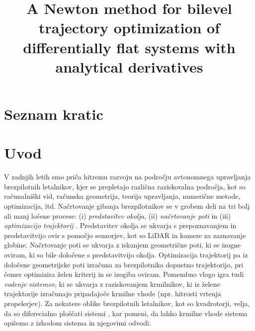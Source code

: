 \documentclass[mat2, tisk]{fmfdelo}
\title{A Newton method for bilevel trajectory optimization of differentially flat systems with analytical derivatives}
\begin{document}
\section*{Seznam kratic}
\printacronyms[heading=none]

\section{Uvod}

V zadnjih letih smo priča hitremu razvoju na področju avtonomnega upravljanja brezpilotnih letalnikov, kjer se prepletajo različna raziskovalna področja, kot so računalniški vid, računska geometrija, teorija upravljanja, numerične metode, optimizacija, itd.  Načrtovanje gibanja brezpilotnikov se v grobem deli na tri bolj ali manj ločene procese: (i) \textit{predstavitev okolja}, (ii) \textit{načrtovanje poti} in (iii) \textit{optimizacijo trajektorij} \cite{zhou2025survey}. Predstavitev okolja se ukvarja s prepoznavanjem in predstavitvijo ovir s pomočjo senzorjev, kot so LiDAR in kamere za zaznavanje globine. Načrtovanje poti se ukvarja z iskanjem geometrične poti, ki se izogne oviram, ki so bile določene s  predstavitvijo okolja. Optimizacija trajektorij pa iz določene geometrijske poti izračuna za brezpilotnika dopustno trajektorijo, pri čemer optimizira želen kriterij in se izogiba oviram. Pomembno vlogo igra tudi \textit{vodenje sistemov}, ki se ukvarja z raziskovanjem krmilnikov, ki iz želene trajektorije izračunajo pripadajoče krmilne vhode (npr. hitrosti vrtenja propelerjev). Za nekatere oblike brezpilotnih letalnikov, kot so kvadrotorji, velja, da so diferecialno ploščati sistemi \cite{mellinger2011minimum}, kar pomeni, da lahko krmilne vhode sistema opišemo z izhodom sistema in njegovimi odvodi.
\end{document}
